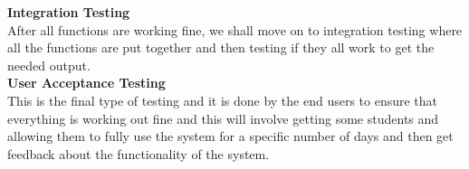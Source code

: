 \documentclass {article}
\begin{document}
\noindent \textbf{Integration Testing \\}
\noindent After all functions are working fine, we shall move on to integration testing where all the functions are put together and then testing if they all work to get the needed output.\\

\noindent \textbf{User Acceptance Testing \\}
\noindent This is the final type of testing and it is done by the end users to ensure that everything is working out fine and this will involve getting some students and allowing them to fully use the system for a specific number of days and then get feedback about the functionality of the system. 


\end{document}
